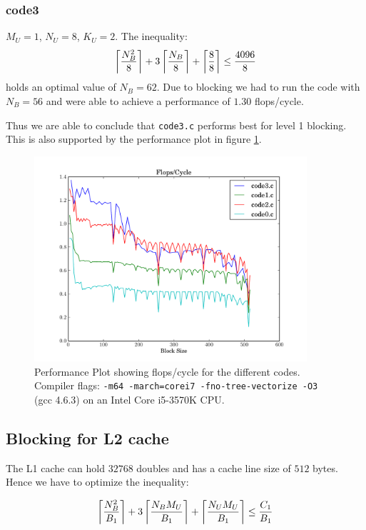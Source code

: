 \documentclass[portrait,a4paper]{article}
\begin{document}
\subsubsection{code3}
$M_U=1$, $N_U=8$, $K_U=2$. The inequality:
\begin{align*}
    \left\lceil {N_B^2 \over 8} \right\rceil + 3\left\lceil {N_B \over 8} \right\rceil
    + \left\lceil {8 \over 8} \right\rceil \leq {4096 \over 8}
\end{align*}
holds an optimal value of $N_B=62$. Due to blocking we had to run the code with $N_B=56$ and were able to achieve a performance of $1.30$ flops/cycle.

Thus we are able to conclude that \lstinline{code3.c} performs best for level 1 blocking. This is also supported by the performance plot in figure \ref{fig:flops_cycle}.

\begin{figure}[H]
    \centering
    \includegraphics[width=0.9\textwidth]{code/flops_cycle}
    \caption{Performance Plot showing flops/cycle for the different codes. Compiler flags: \texttt{-m64 -march=corei7 -fno-tree-vectorize -O3} (gcc 4.6.3) on an Intel Core i5-3570K CPU.}
    \label{fig:flops_cycle}
\end{figure}  

\subsection{Blocking for L2 cache}
The L1 cache can hold $32768$ doubles and has a cache line size of $512$ bytes. Hence we have to optimize the inequality:

\begin{align*}
    \left\lceil {N_B^2 \over B_1} \right\rceil + 3\left\lceil {N_B M_U \over B_1} \right\rceil
    + \left\lceil {N_U M_U \over B_1} \right\rceil \leq {C_1 \over B_1}
\end{align*}
\end{document}
